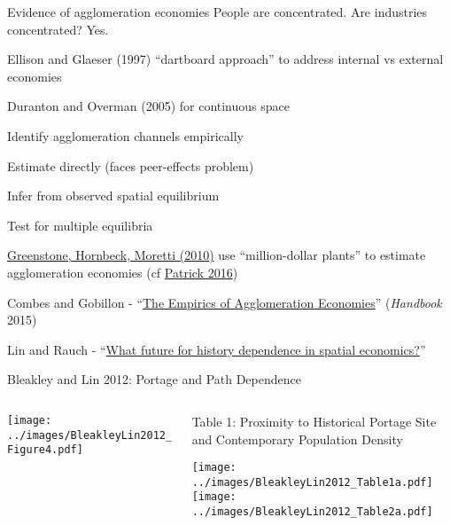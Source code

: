 \documentclass[11pt,notes=hide,aspectratio=169]{beamer}
\begin{document}
\begin{frame}{Evidence of agglomeration economies}
People are concentrated. Are industries concentrated? Yes.
\begin{itemize}{\small
	\item Ellison and Glaeser (1997) ``dartboard approach'' to address internal vs external economies
	\item Duranton and Overman (2005) for continuous space
}\end{itemize}
Identify agglomeration channels empirically
\begin{itemize}{\small
	\item Estimate directly (faces peer-effects problem)
	\item Infer from observed spatial equilibrium
	\item Test for multiple equilibria
	\item \href{https://www.journals.uchicago.edu/doi/abs/10.1086/653714}{Greenstone, Hornbeck, Moretti (2010)} use ``million-dollar plants'' to estimate agglomeration economies
  (cf \href{https://onlinelibrary.wiley.com/doi/abs/10.1111/ecin.12339}{Patrick 2016})
	\item Combes and Gobillon - ``\href{https://www.sciencedirect.com/science/article/pii/B9780444595171000052}{The Empirics of Agglomeration Economies}'' (\textit{Handbook} 2015)
	\item Lin and Rauch - ``\href{https://www.sciencedirect.com/science/article/pii/S0166046220303136}{What future for history dependence in spatial economics?}''
}\end{itemize}
\end{frame}
\begin{frame}{Bleakley and Lin 2012: Portage and Path Dependence}
\begin{columns}
\begin{column}{.45\textwidth}
\texttt{[image: ../images/BleakleyLin2012\_Figure4.pdf]}
\end{column}
\begin{column}{.40\textwidth}
{\tiny Table 1: Proximity to Historical Portage Site and Contemporary Population Density\par}
\texttt{[image: ../images/BleakleyLin2012\_Table1a.pdf]} \\
\texttt{[image: ../images/BleakleyLin2012\_Table2a.pdf]}
\end{column}
\end{columns}
\end{frame}
\end{document}
